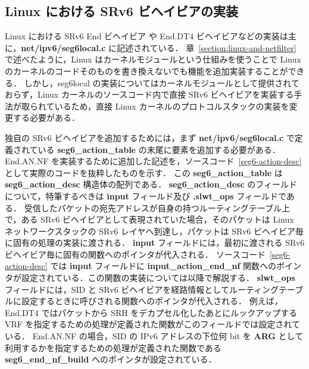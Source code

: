 \subsection{Linux における SRv6 ビヘイビアの実装}
\label{sbsection:linux-packet-forwarding}
Linux における SRv6 End ビヘイビア や End.DT4 ビヘイビアなどの実装は主に，\textbf{net/ipv6/seg6local.c} に記述されている．
章~\ref{section:linux-and-netfilter} で述べたように，Linux はカーネルモジュールという仕組みを使うことで Linux のカーネルのコードそのものを書き換えないでも機能を追加実装することができる．
しかし，seg6local の実装についてはカーネルモジュールとして提供されておらず，Linux カーネルのソースコード内で直接 SRv6 ビヘイビアを実装する手法が取られているため，直接 Linux カーネルのプロトコルスタックの実装を変更する必要がある．


独自の SRv6 ビヘイビアを追加するためには，まず \textbf{net/ipv6/seg6local.c} で定義されている \textbf{seg6\_action\_table} の末尾に要素を追加する必要がある．
End.AN.NF を実装するために追加した記述を，ソースコード~\ref*{seg6-action-desc} として実際のコードを抜粋したものを示す．
この \textbf{seg6\_action\_table} は \textbf{seg6\_action\_desc} 構造体の配列である．
\textbf{seg6\_action\_desc} のフィールドについて，特筆するべきは \textbf{input} フィールド及び \textbf{.slwt\_ops} フィールドである．
受信したパケットの宛先アドレスが自身の持つルーティングテーブル上で，ある SRv6 ビヘイビアとして表現されていた場合，そのパケットは Linux ネットワークスタックの SRv6 レイヤへ到達し，パケットは SRv6 ビヘイビア毎に固有の処理の実装に渡される．
\textbf{input} フィールドには，最初に渡される SRv6 ビヘイビア毎に固有の関数へのポインタが代入される．
ソースコード~\ref*{seg6-action-desc} では \textbf{input} フィールドに \textbf{input\_action\_end\_nf} 関数へのポインタが設定されている．この関数の実装については以降で解説する．
\textbf{slwt\_ops} フィールドには，SID と SRv6 ビヘイビアを経路情報としてルーティングテーブルに設定するときに呼びされる関数へのポインタが代入される．
例えば，End.DT4 ではパケットから SRH をデカプセル化したあとにルックアップする VRF を指定するための処理が定義された関数がこのフィールドでは設定されている．
End.AN.NF の場合，SID の IPv6 アドレスの下位何 bit を \textbf{ARG} として利用するかを指定するための処理が定義された関数である \textbf{seg6\_end\_nf\_build} へのポインタが設定されている．

